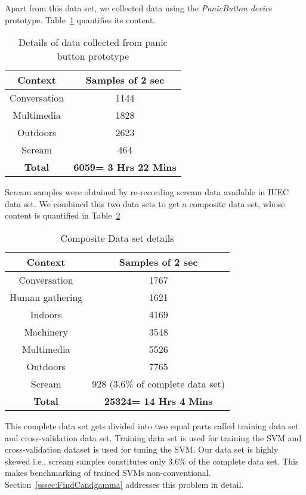 Apart from this data set, we collected data using the \emph{PanicButton device} prototype. Table~\ref{tab:quandata2} quantifies its content.
\begin{table}[H]
\begin{center}
\begin{tabular}{ |c|c| } 
 \hline
 \textbf{Context} & \textbf{Samples of 2 sec} \\ 
 \hline
 \hline
 Conversation & 1144 \\ 
 \hline
 Multimedia & 1828 \\
 \hline
 Outdoors & 2623 \\
 \hline
 Scream & 464 \\
 \hline
 \hline
 \textbf{Total} & \textbf{6059= 3 Hrs 22 Mins}\\
 \hline
\end{tabular}
\end{center}
\caption{Details of data collected from panic button prototype} \label{tab:quandata2}
\end{table}

Scream samples were obtained by re-recording scream data available in IUEC data set. We combined this two data sets to get a composite data set, whose content is quantified in Table~\ref{tab:quandata3}
\begin{table}[H]
\begin{center}
\begin{tabular}{ |c|c| } 
 \hline
 \textbf{Context} & \textbf{Samples of 2 sec} \\ 
 \hline
 \hline
 Conversation & 1767 \\
 \hline 
 Human gathering & 1621 \\ 
 \hline
 Indoors & 4169 \\
 \hline
 Machinery & 3548 \\
 \hline
 Multimedia & 5526 \\
 \hline
 Outdoors & 7765 \\
 \hline
 Scream & 928 (3.6\% of complete data set)\\
 \hline
 \hline
 \textbf{Total} & \textbf{25324= 14 Hrs 4 Mins}\\
 \hline
\end{tabular}
\end{center}
\caption{Composite Data set details} \label{tab:quandata3}
\end{table}

This complete data set gets divided into two equal parts called training data set and cross-validation data set. Training data set is used for training the SVM and cross-validation dataset is used for tuning the SVM. Our data set is highly skewed i.e., scream samples constitutes only 3.6\% of the complete data set. This makes benchmarking of trained SVMs non-conventional. Section~\ref{sssec:FindCandgamma} addresses this problem in detail.

